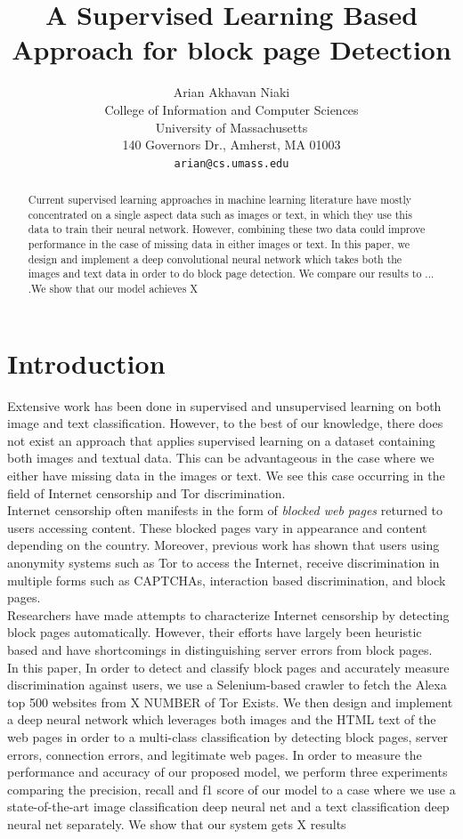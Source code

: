 \documentclass{article} %
\title{A Supervised Learning Based Approach for block page Detection}
\author{
Arian Akhavan Niaki\\
College of Information and Computer Sciences\\
University of Massachusetts\\
140 Governors Dr., Amherst, MA 01003 \\
\texttt{arian@cs.umass.edu} \\
}
\begin{document}
\maketitle

\begin{abstract}
Current supervised learning approaches in machine learning literature have mostly concentrated on a single aspect data such as images or text, in which they use this data to train their neural network. However, combining these two data could improve performance in the case of missing data in either images or text. In this paper, we design and implement a deep convolutional neural network which takes both the images and text data in order to do block page detection. We compare our results to ... .We show that our model achieves X 
\end{abstract}
\section{Introduction}
Extensive work has been done in supervised and unsupervised learning on both image and text classification. However, to the best of our knowledge, there does not exist an approach that applies supervised learning on a dataset containing both images and textual data. This can be advantageous in the case where we either have missing data in the images or text. We see this case occurring in the field of Internet censorship and Tor discrimination.\\
Internet censorship often manifests in the form of \emph{blocked web pages} returned to users accessing content. These blocked pages vary in appearance and content depending on the country. 
Moreover, previous work has shown that users using anonymity systems such as Tor to access the Internet, receive discrimination in multiple forms such as CAPTCHAs, interaction based discrimination, and block pages. \\
Researchers have made attempts to characterize Internet censorship by detecting block pages automatically. However, their efforts have largely been heuristic based and have shortcomings in distinguishing server errors from block pages.\\
In this paper, In order to detect and classify block pages and accurately measure discrimination against users, we use a Selenium-based crawler to fetch the Alexa top 500 websites from X NUMBER of Tor Exists. We then design and implement a deep neural network which leverages both images and the HTML text of the web pages in order to a multi-class classification by detecting block pages, server errors, connection errors, and legitimate web pages. In order to measure the performance and accuracy of our proposed model, we perform three experiments comparing the precision, recall and f1 score of our model to a case where we use a state-of-the-art image classification deep neural net and a text classification deep neural net separately. We show that our system gets X results
\end{document}

